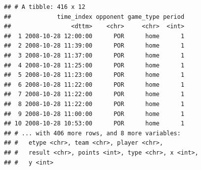 \documentclass[10pt,]{krantz}
\makeatletter
\newenvironment{Shaded}{\begin{snugshade}}{\end{snugshade}}
\newcommand{\KeywordTok}[1]{\textcolor[rgb]{0.13,0.29,0.53}{\textbf{#1}}}
\newcommand{\StringTok}[1]{\textcolor[rgb]{0.31,0.60,0.02}{#1}}
\newcommand{\CommentTok}[1]{\textcolor[rgb]{0.56,0.35,0.01}{\textit{#1}}}
\newcommand{\OperatorTok}[1]{\textcolor[rgb]{0.81,0.36,0.00}{\textbf{#1}}}
\newcommand{\NormalTok}[1]{#1}
\newenvironment{kframe}{%
\medskip{}
\setlength{\fboxsep}{.8em}
 \def\at@end@of@kframe{}%
 \ifinner\ifhmode%
  \def\at@end@of@kframe{\end{minipage}}%
  \begin{minipage}{\columnwidth}%
 \fi\fi%
 \def\FrameCommand##1{\hskip\@totalleftmargin \hskip-\fboxsep
 \colorbox{shadecolor}{##1}\hskip-\fboxsep
     \hskip-\linewidth \hskip-\@totalleftmargin \hskip\columnwidth}%
 \MakeFramed {\advance\hsize-\width
   \@totalleftmargin\z@ \linewidth\hsize
   \@setminipage}}%
 {\par\unskip\endMakeFramed%
 \at@end@of@kframe}
\renewenvironment{Shaded}{\begin{kframe}}{\end{kframe}}
\makeatother
\begin{document}
\begin{Shaded}
\end{Shaded}

\begin{verbatim}
## # A tibble: 416 x 12
##             time_index opponent game_type period
##                 <dttm>    <chr>     <chr>  <int>
##  1 2008-10-28 12:00:00      POR      home      1
##  2 2008-10-28 11:39:00      POR      home      1
##  3 2008-10-28 11:37:00      POR      home      1
##  4 2008-10-28 11:25:00      POR      home      1
##  5 2008-10-28 11:23:00      POR      home      1
##  6 2008-10-28 11:22:00      POR      home      1
##  7 2008-10-28 11:22:00      POR      home      1
##  8 2008-10-28 11:22:00      POR      home      1
##  9 2008-10-28 11:00:00      POR      home      1
## 10 2008-10-28 10:53:00      POR      home      1
## # ... with 406 more rows, and 8 more variables:
## #   etype <chr>, team <chr>, player <chr>,
## #   result <chr>, points <int>, type <chr>, x <int>,
## #   y <int>
\end{verbatim}
\end{document}
